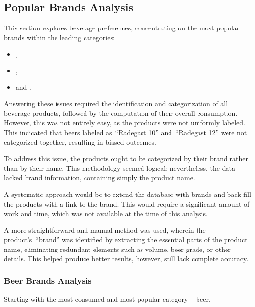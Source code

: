 \subsection{Popular Brands Analysis}
\label{subsec:analysis-beverage-popular-brands}

This section explores beverage preferences, concentrating on the most popular brands within the leading categories:
\begin{itemize}
	\item {},
	\item {},
	\item and~.
\end{itemize}

Answering these issues required the identification and categorization of all beverage products, followed by the computation of their overall consumption.
However, this was not entirely easy, as the products were not uniformly labeled.
This indicated that beers labeled as~\enquote{Radegast 10} and~\enquote{Radegast 12} were not categorized together, resulting in biased outcomes.

To address this issue, the products ought to be categorized by their brand rather than by their name.
This methodology seemed logical; nevertheless, the data lacked brand information, containing simply the product name.

A systematic approach would be to extend the database with brands and back-fill the products with a link to the brand.
This would require a significant amount of work and time, which was not available at the time of this analysis.

A more straightforward and manual method was used, wherein the product's~\enquote{brand} was identified by extracting the essential parts of the product name, eliminating redundant elements such as volume, beer grade, or other details.
This helped produce better results, however, still lack complete accuracy.


\subsubsection{Beer Brands Analysis}
\label{subsubsec:analysis-beverage-popular-beer}
Starting with the most consumed and most popular category – beer.

